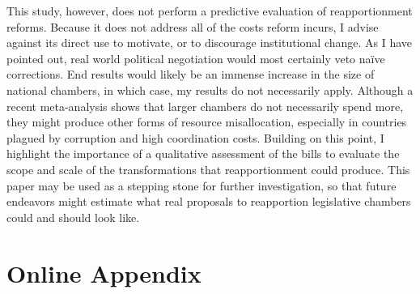 \documentclass[a4paper,12pt]{article}
\begin{document}
This study, however, does not perform a predictive evaluation of reapportionment reforms. Because it does not address all of the costs reform incurs, I advise against its direct use to motivate, or to discourage institutional change. As I have pointed out, real world political negotiation would most certainly veto naïve corrections. End results would likely be an immense increase in the size of national chambers, in which case, my results do not necessarily apply. Although a recent meta-analysis \citep{alptekin2020effect} shows that larger chambers do not necessarily spend more, they might produce other forms of resource misallocation, especially in countries plagued by corruption and high coordination costs. Building on this point, I highlight the importance of a qualitative assessment of the bills to evaluate the scope and scale of the transformations that reapportionment could produce. This paper may be used as a stepping stone for further investigation, so that future endeavors might estimate what real proposals to reapportion legislative chambers could and should look like.


\newpage



\newpage

\section{Online Appendix}
\end{document}

